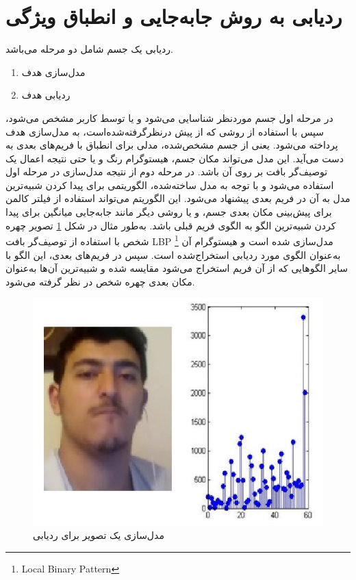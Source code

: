 \documentclass[paper=a4, fontsize=12pt]{article} %
\begin{document}
\section{	ردیابی به روش جابه‌جایی و انطباق ویژگی}
ردیابی یک جسم شامل دو مرحله می‌باشد.
\begin{enumerate}
\item مدل‌سازی هدف
\item ردیابی هدف
\end{enumerate}
در مرحله اول جسم موردنظر شناسایی می‌شود و یا توسط کاربر مشخص می‌شود، سپس با استفاده از روشی که از پیش درنظرگرفته‌شده‌است، به مدل‌سازی هدف پرداخته می‌شود. یعنی از جسم مشخص‌شده، مدلی برای انطباق با فریم‌های بعدی به دست می‌آید. این مدل می‌تواند مکان جسم، هیستوگرام رنگ و یا حتی نتیجه اعمال یک توصیف‌گر بافت بر روی آن باشد.
در مرحله دوم از نتیجه مدل‌سازی در مرحله اول استفاده می‌شود و با توجه به مدل ساخته‌شده، الگوریتمی برای پیدا کردن شبیه‌ترین مدل به آن در فریم بعدی پیشنهاد می‌شود. این الگوریتم می‌تواند استفاده از فیلتر کالمن برای پیش‌بینی مکان بعدی جسم، و یا روشی دیگر مانند جابه‌جایی میانگین برای پیدا کردن شبیه‌ترین الگو به الگوی فریم قبلی باشد.
به‌طور مثال در شکل \ref{pic-1} تصویر چهره شخص با استفاده از توصیف‌گر بافت LBP \footnote{Local Binary Pattern} مدل‌سازی شده است و هیستوگرام آن به‌عنوان الگوی مورد ردیابی استخراج‌شده است. سپس در فریم‌های بعدی، این الگو با سایر الگوهایی که از آن فریم استخراج می‌شود مقایسه شده و شبیه‌ترین آن‌ها به‌عنوان مکان بعدی چهره شخص در نظر گرفته می‌شود.
\begin{figure}[h]
\centering
\includegraphics[scale=0.8]{fig1.jpg}
\caption{مدل‌سازی یک تصویر برای ردیابی}
\label{pic-1}
\end{figure}
\end{document}
